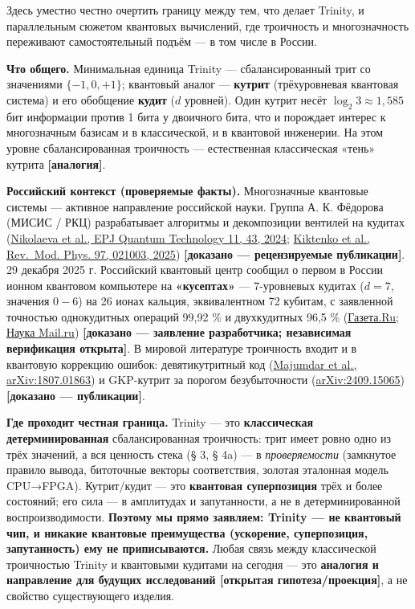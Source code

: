 \documentclass[
  russian,
]{article}
\begin{document}
Здесь уместно честно очертить границу между тем, что делает Trinity, и
параллельным сюжетом квантовых вычислений, где троичность и
многозначность переживают самостоятельный подъём --- в том числе в
России.

\textbf{Что общего.} Минимальная единица Trinity --- сбалансированный
трит со значениями \(\{-1, 0, +1\}\); квантовый аналог ---
\textbf{кутрит} (трёхуровневая квантовая система) и его обобщение
\textbf{кудит} (\(d\) уровней). Один кутрит несёт
\(\log_2 3 \approx 1{,}585\) бит информации против 1 бита у двоичного
бита, что и порождает интерес к многозначным базисам и в классической, и
в квантовой инженерии. На этом уровне сбалансированная троичность ---
естественная классическая «тень» кутрита \textbf{{[}аналогия{]}}.

\textbf{Российский контекст (проверяемые факты).} Многозначные квантовые
системы --- активное направление российской науки. Группа А. К. Фёдорова
(МИСИС / РКЦ) разрабатывает алгоритмы и декомпозиции вентилей на кудитах
(\href{https://arxiv.org/html/2111.04384v3}{Nikolaeva et al., EPJ
Quantum Technology 11, 43, 2024};
\href{https://arxiv.org/html/2311.12003v2}{Kiktenko et al., Rev.~Mod.
Phys. 97, 021003, 2025}) \textbf{{[}доказано --- рецензируемые
публикации{]}}. 29 декабря 2025 г. Российский квантовый центр сообщил о
первом в России ионном квантовом компьютере на \textbf{«кусептах»} ---
7-уровневых кудитах (\(d=7\), значения \(0\!-\!6\)) на 26 ионах кальция,
эквивалентном 72 кубитам, с заявленной точностью однокудитных операций
99,92 \% и двухкудитных 96,5 \%
(\href{https://www.gazeta.ru/science/news/2025/12/29/27509077.shtml}{Газета.Ru};
\href{https://science.mail.ru/articles/42106-pervyj-v-rossii-kvantovyj-kompyuter-na-kuseptah/}{Наука
Mail.ru}) \textbf{{[}доказано --- заявление разработчика; независимая
верификация открыта{]}}. В мировой литературе троичность входит и в
квантовую коррекцию ошибок: девятикутритный код
(\href{https://arxiv.org/abs/1807.01863}{Majumdar et al.,
arXiv:1807.01863}) и GKP-кутрит за порогом безубыточности
(\href{https://www.arxiv.org/abs/2409.15065}{arXiv:2409.15065})
\textbf{{[}доказано --- публикации{]}}.

\textbf{Где проходит честная граница.} Trinity --- это
\textbf{классическая детерминированная} сбалансированная троичность:
трит имеет ровно одно из трёх значений, а вся ценность стека (§ 3, § 4a)
--- в \emph{проверяемости} (замкнутое правило вывода, битоточные векторы
соответствия, золотая эталонная модель CPU→FPGA). Кутрит/кудит
--- это \textbf{квантовая суперпозиция} трёх и более состояний; его сила
--- в амплитудах и запутанности, а не в детерминированной
воспроизводимости. \textbf{Поэтому мы прямо заявляем: Trinity --- не
квантовый чип, и никакие квантовые преимущества (ускорение,
суперпозиция, запутанность) ему не приписываются.} Любая связь между
классической троичностью Trinity и квантовыми кудитами на сегодня ---
это \textbf{аналогия и направление для будущих исследований {[}открытая
гипотеза/проекция{]}}, а не свойство существующего изделия.
\end{document}
